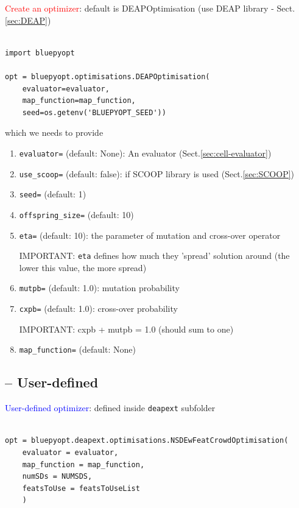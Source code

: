 \textcolor{red}{Create an optimizer}: default is DEAPOptimisation (use DEAP
library - Sect.\ref{sec:DEAP})
\begin{lstlisting}

import bluepyopt

opt = bluepyopt.optimisations.DEAPOptimisation(
    evaluator=evaluator,
    map_function=map_function,
    seed=os.getenv('BLUEPYOPT_SEED'))

\end{lstlisting}
which we needs to provide
\begin{enumerate}
  \item \verb!evaluator=! (default: None): An evaluator
  (Sect.\ref{sec:cell-evaluator})

  \item \verb!use_scoop=! (default: false): if SCOOP library is used
  (Sect.\ref{sec:SCOOP})

  \item \verb!seed=! (default: 1)

  \item \verb!offspring_size=! (default: 10)

  \item \verb!eta=! (default: 10): the parameter of mutation and cross-over
  operator

IMPORTANT: \verb!eta! defines how much they 'spread' solution around (the lower
this value, the more spread)

  \item \verb!mutpb=! (default: 1.0): mutation probability

  \item \verb!cxpb=! (default: 1.0): cross-over probability

IMPORTANT: cxpb + mutpb = 1.0 (should sum to one)

  \item \verb!map_function=! (default: None)



\end{enumerate}

\subsection{-- User-defined}

\textcolor{blue}{User-defined optimizer}: defined inside \verb!deapext!
subfolder
\begin{lstlisting}

opt = bluepyopt.deapext.optimisations.NSDEwFeatCrowdOptimisation(
    evaluator = evaluator,
    map_function = map_function,
    numSDs = NUMSDS,
    featsToUse = featsToUseList
    )
\end{lstlisting}



